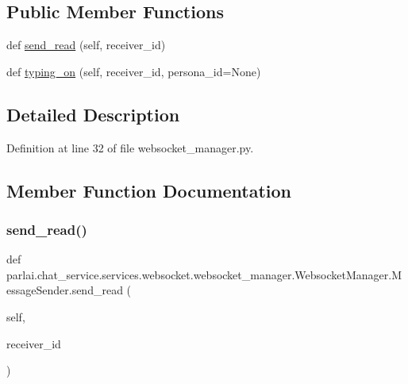 \subsection*{Public Member Functions}
\begin{DoxyCompactItemize}
\item 
def \hyperlink{classparlai_1_1chat__service_1_1services_1_1websocket_1_1websocket__manager_1_1WebsocketManager_1_1MessageSender_ab5aa744f9945196012c2fed3a29779dd}{send\+\_\+read} (self, receiver\+\_\+id)
\item 
def \hyperlink{classparlai_1_1chat__service_1_1services_1_1websocket_1_1websocket__manager_1_1WebsocketManager_1_1MessageSender_a3506683d0a5ab2fd03a585d4bfe51c92}{typing\+\_\+on} (self, receiver\+\_\+id, persona\+\_\+id=None)
\end{DoxyCompactItemize}


\subsection{Detailed Description}


Definition at line 32 of file websocket\+\_\+manager.\+py.



\subsection{Member Function Documentation}
\mbox{\label{classparlai_1_1chat__service_1_1services_1_1websocket_1_1websocket__manager_1_1WebsocketManager_1_1MessageSender_ab5aa744f9945196012c2fed3a29779dd}} 
\subsubsection{\texorpdfstring{send\+\_\+read()}{send\_read()}}
{\footnotesize\ttfamily def parlai.\+chat\+\_\+service.\+services.\+websocket.\+websocket\+\_\+manager.\+Websocket\+Manager.\+Message\+Sender.\+send\+\_\+read (\begin{DoxyParamCaption}\item[{}]{self,  }\item[{}]{receiver\+\_\+id }\end{DoxyParamCaption})}



